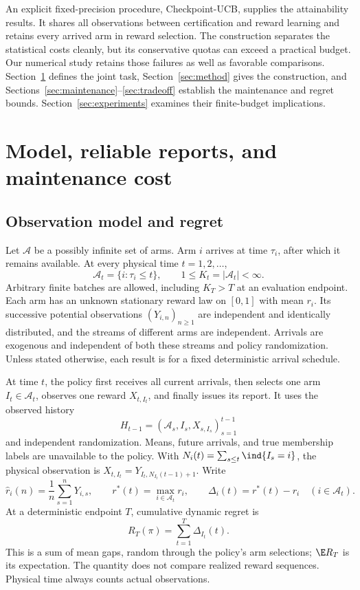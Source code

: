 \documentclass[11pt]{article}
\begin{document}
An explicit fixed-precision procedure, Checkpoint-UCB, supplies the
attainability results. It shares all observations between certification
and reward learning and retains every arrived arm in reward selection.
The construction separates the statistical costs cleanly, but its
conservative quotas can exceed a practical budget. Our numerical study
retains those failures as well as favorable comparisons. Section~\ref{sec:model}
defines the joint task, Section~\ref{sec:method} gives the construction,
and Sections~\ref{sec:maintenance}--\ref{sec:tradeoff} establish the
maintenance and regret bounds. Section~\ref{sec:experiments} examines their
finite-budget implications.

\section{Model, reliable reports, and maintenance cost}
\label{sec:model}
\label{sec:problem}

\subsection{Observation model and regret}

Let $\mathcal A$ be a possibly infinite set of arms. Arm $i$ arrives at
time $\tau_i$, after which it remains available. At every physical time
$t=1,2,\ldots$,
\[
 \mathcal A_t=\{i:\tau_i\le t\},\qquad
 1\le K_t=|\mathcal A_t|<\infty.
\]
Arbitrary finite batches are allowed, including $K_T>T$ at an evaluation
endpoint. Each arm has an unknown stationary reward law on $[0,1]$ with
mean $r_i$. Its successive potential observations $(Y_{i,n})_{n\ge1}$ are
independent and identically distributed, and the streams of different arms
are independent. Arrivals are exogenous and independent of both these
streams and policy randomization. Unless stated otherwise, each result
is for a fixed deterministic arrival schedule.

At time $t$, the policy first receives all current arrivals, then selects
one arm $I_t\in\mathcal A_t$, observes one reward $X_{t,I_t}$, and finally
issues its report. It uses the observed history
\[
 H_{t-1}=(\mathcal A_s,I_s,X_{s,I_s})_{s=1}^{t-1}
\]
and independent randomization. Means, future arrivals, and true membership
labels are unavailable to the policy. With
$N_i(t)=\sum_{s\le t}\ind\{I_s=i\}$, the physical observation is
$X_{t,I_t}=Y_{I_t,N_{I_t}(t-1)+1}$. Write
\[
 \hat r_i(n)=\frac1n\sum_{s=1}^nY_{i,s},\qquad
 r^*(t)=\max_{i\in\mathcal A_t}r_i,\qquad
 \Delta_i(t)=r^*(t)-r_i \quad(i\in\mathcal A_t).
\]
At a deterministic endpoint $T$, cumulative dynamic regret is
\[
 R_T(\pi)=\sum_{t=1}^{T}\Delta_{I_t}(t).
\]
This is a sum of mean gaps, random through the policy's arm selections;
$\E R_T$ is its expectation. The quantity does not compare realized
reward sequences. Physical time always counts actual observations.
\end{document}
